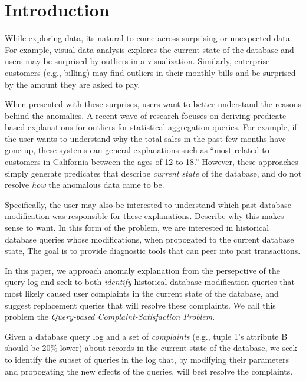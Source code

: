 
\section{Introduction}
\label{s:intro}


While exploring data, its natural to come across surprising or unexpected data.
For example, visual data analysis explores the current state of the database and users may be surprised by outliers in a visualization.
Similarly, enterprise customers (e.g., billing) may find outliers in their monthly bills and be surprised by the amount they are asked to pay.

When presented with these surprises, users want to better understand the reasons behind the anomalies.
A recent wave of research focuses on deriving predicate-based explanations for outliers for statistical aggregation queries.
For example, if the user wants to understand why the total sales in the past few months have gone up, these systems can general explanations such as ``most related to customers in California between the ages of 12 to 18.''
However, these approaches simply generate predicates that describe {\it current state} of the database, and do not resolve {\it how} the anomalous data came to be.

Specifically, the user may also be interested to understand which past database modification was responsible for these explanations.
Describe why this makes sense to want.  In this form of the problem, we are interested in historical database queries whose modifications, when propogated to the current database state, 
The goal is to provide diagnostic tools that can peer into past transactions.


In this paper, we approach anomaly explanation from the persepctive of the query log and seek to
both {\it identify}  historical database modification queries that most likely caused user complaints 
in the current state of the database, and suggest replacement queries that will resolve these complaints.
We call this problem the {\it Query-based Complaint-Satisfaction Problem}.

Given a database query log and a set of {\it complaints} (e.g., tuple 1's attribute B should be 20\% lower) about records in the current state of the database,
we seek to identify the subset of queries in the log that, by modifying their parameters and propogating the new effects of the queries, 
will best resolve the complaints.  

